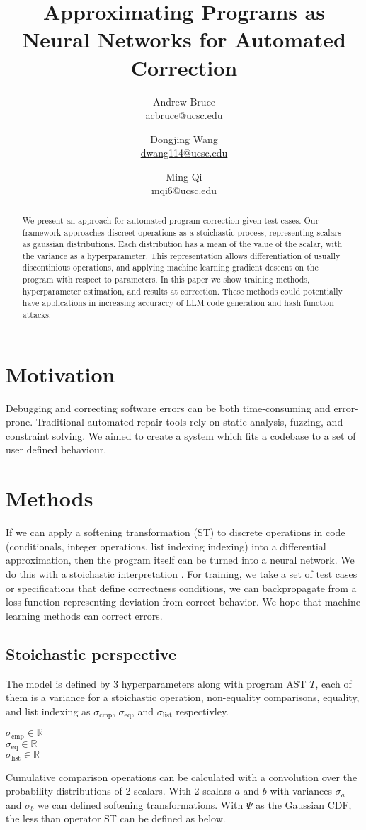 \documentclass{article}
\title{Approximating Programs as Neural Networks for Automated Correction}
\author{
  Andrew Bruce \\ \href{mailto:acbruce@ucsc.edu}{acbruce@ucsc.edu}
  \and
  Dongjing Wang \\ \href{mailto:dwang114@ucsc.edu}{dwang114@ucsc.edu}
  \and
  Ming Qi \\ \href{mailto:mqi6@ucsc.edu}{mqi6@ucsc.edu}
}
\begin{document}
\maketitle

\begin{abstract}
  We present an approach for automated program correction given test cases. Our framework approaches discreet operations as a stoichastic process, representing scalars as gaussian distributions. Each distribution has a mean of the value of the scalar, with the variance as a hyperparameter. This representation allows differentiation of usually discontinious operations, and applying machine learning gradient descent on the program with respect to parameters. In this paper we show training methods, hyperparameter estimation, and results at correction. These methods could potentially have applications in increasing accuraccy of LLM code generation and hash function attacks.
\end{abstract}

\section*{Motivation}
Debugging and correcting software errors can be both time-consuming and error-prone. Traditional automated repair tools rely on static analysis, fuzzing, and constraint solving. We aimed to create a system which fits a codebase to a set of user defined behaviour.
\section*{Methods}
If we can apply a softening transformation (ST) to discrete operations in code (conditionals, integer operations, list indexing indexing) into a differential approximation, then the program itself can be turned into a neural network. We do this with a stoichastic interpretation \cite{blondel2024elementsdifferentiableprogramming}. For training, we take a set of test cases or specifications that define correctness conditions, we can backpropagate from a loss function representing deviation from correct behavior. We hope that machine learning methods can correct errors.
\subsection*{Stoichastic perspective}
The model is defined by 3 hyperparameters along with program AST $T$, each of them is a variance for a stoichastic operation, non-equality comparisons, equality, and list indexing as $\sigma_{\text{cmp}}$, $\sigma_{\text{eq}}$, and $\sigma_{\text{list}}$ respectivley.
\begin{center}
  $\sigma_{\text{cmp}} \in \mathbb{R}$\\
  $\sigma_{\text{eq}} \in \mathbb{R}$\\
  $\sigma_{\text{list}} \in \mathbb{R}$
\end{center}
Cumulative comparison operations can be calculated with a convolution over the probability distributions of 2 scalars. With 2 scalars $a$ and $b$ with variances $\sigma_a$ and $\sigma_b$ we can defined softening transformations. With $\Psi$ as the Gaussian CDF, the less than operator ST can be defined as below.
\end{document}
